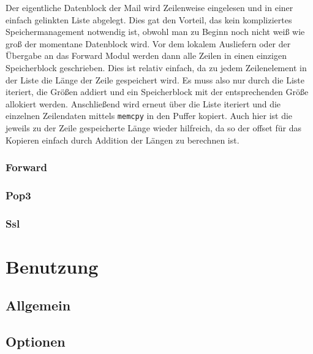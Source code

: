 \documentclass[final,a4paper,11pt,notitlepage,halfparskip]{scrreprt}
\begin{document}
Der eigentliche Datenblock der Mail wird Zeilenweise eingelesen und in einer
einfach gelinkten Liste abgelegt. Dies gat den Vorteil, das kein kompliziertes
Speichermanagement notwendig ist, obwohl man zu Beginn noch nicht weiß wie groß
der momentane Datenblock wird. Vor dem lokalem Ausliefern oder der Übergabe an
das Forward Modul werden dann alle Zeilen in einen einzigen Speicherblock
geschrieben. Dies ist relativ einfach, da zu jedem Zeilenelement in der Liste
die Länge der Zeile gespeichert wird. Es muss also nur durch die Liste iteriert,
die Größen addiert und ein Speicherblock mit der entsprechenden Größe allokiert
werden. Anschließend wird erneut über die Liste iteriert und die einzelnen
Zeilendaten mittels \texttt{memcpy} in den Puffer kopiert. Auch hier ist die
jeweils zu der Zeile gespeicherte Länge wieder hilfreich, da so der offset für
das Kopieren einfach durch Addition der Längen zu berechnen ist.


\subsection{Forward}
\subsection{Pop3}
\subsection{Ssl}

\chapter{Benutzung}

\section{Allgemein}
\section{Optionen}

\pagebreak
\end{document}
